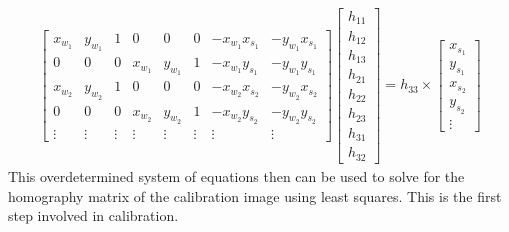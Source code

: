 \documentclass[12pt,oneside,openany,a4paper, %
english, %
masters-t, goldenblock]{usthesis}
\begin{document}

\begin{align}
  \begin{bmatrix}
  x_{w_1} & y_{w_1} & 1 & 0 & 0 & 0 & -x_{w_1} x_{s_1} & -y_{w_1} x_{s_1} \\
  0 & 0 & 0 & x_{w_1} & y_{w_1} & 1 & -x_{w_1} y_{s_1} & -y_{w_1} y_{s_1} \\
  x_{w_2} & y_{w_2} & 1 & 0 & 0 & 0 & -x_{w_2} x_{s_2} & -y_{w_2} x_{s_2} \\
  0 & 0 & 0 & x_{w_2} & y_{w_2} & 1 & -x_{w_2} y_{s_2} & -y_{w_2} y_{s_2} \\
  \vdots & \vdots & \vdots & \vdots & \vdots & \vdots & \vdots & \vdots 
  \end{bmatrix}
  \begin{bmatrix}
  h_{11} \\
  h_{12} \\
  h_{13} \\
  h_{21} \\
  h_{22} \\
  h_{23} \\
  h_{31} \\
  h_{32}
  \end{bmatrix} = h_{33} \times
  \begin{bmatrix}
  x_{s_1} \\
  y_{s_1} \\
  x_{s_2} \\
  y_{s_2} \\
  \vdots
  \end{bmatrix}
  \label{eq:DLT}
\end{align}
This overdetermined system of equations then can be used to solve for the homography matrix of the calibration image using least squares. This is the first step involved in calibration.
\end{document}
